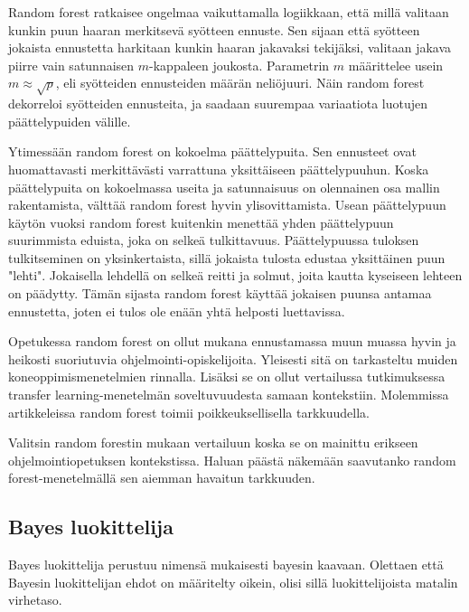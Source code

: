 \documentclass[finnish,twoside,openright]{HYgraduMLDS}
\begin{document}
Random forest ratkaisee ongelmaa vaikuttamalla logiikkaan, että millä valitaan kunkin puun haaran merkitsevä syötteen ennuste. Sen sijaan että syötteen jokaista ennustetta harkitaan kunkin haaran jakavaksi tekijäksi, valitaan jakava piirre vain satunnaisen $m$-kappaleen joukosta. Parametrin $m$ määrittelee usein $m \approx \sqrt{p}$, eli syötteiden ennusteiden määrän neliöjuuri. Näin random forest dekorreloi syötteiden ennusteita, ja saadaan suurempaa variaatiota luotujen päättelypuiden välille\cite{james2013ISLR}.

Ytimessään random forest on kokoelma päättelypuita. Sen ennusteet ovat huomattavasti merkittävästi varrattuna yksittäiseen päättelypuuhun\cite{james2013ISLR}. Koska päättelypuita on kokoelmassa useita ja satunnaisuus on olennainen osa mallin rakentamista, välttää random forest hyvin ylisovittamista\cite{james2013ISLR}. Usean päättelypuun käytön vuoksi random forest kuitenkin menettää yhden päättelypuun suurimmista eduista, joka on selkeä tulkittavuus\cite{james2013ISLR}. Päättelypuussa tuloksen tulkitseminen on yksinkertaista, sillä jokaista tulosta edustaa yksittäinen puun "lehti". Jokaisella lehdellä on selkeä reitti ja solmut, joita kautta kyseiseen lehteen on päädytty. Tämän sijasta random forest käyttää jokaisen puunsa antamaa ennustetta, joten ei tulos ole enään yhtä helposti luettavissa.

Opetukessa random forest on ollut mukana ennustamassa muun muassa hyvin ja heikosti suoriutuvia ohjelmointi-opiskelijoita. Yleisesti sitä on tarkasteltu muiden koneoppimismenetelmien rinnalla\cite{Ahadi:2015:EML:2787622.2787717}. Lisäksi se on ollut vertailussa tutkimuksessa transfer learning-menetelmän soveltuvuudesta samaan kontekstiin\cite{lagus2018transfer}. Molemmissa artikkeleissa random forest toimii poikkeuksellisella tarkkuudella.

Valitsin random forestin mukaan vertailuun koska se on mainittu erikseen ohjelmointiopetuksen kontekstissa. Haluan päästä näkemään saavutanko random forest-menetelmällä sen aiemman havaitun tarkkuuden.


\subsection{Bayes luokittelija}

Bayes luokittelija perustuu nimensä mukaisesti bayesin kaavaan\cite{james2013ISLR}. Olettaen että Bayesin luokittelijan ehdot on määritelty oikein, olisi sillä luokittelijoista matalin virhetaso.
\end{document}
